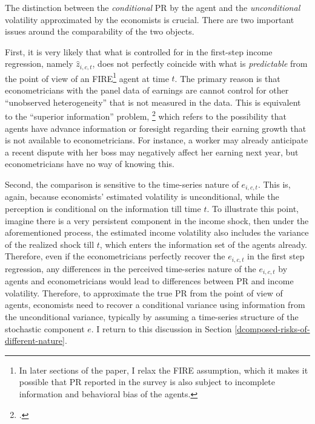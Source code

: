 The distinction between the \emph{conditional} PR by the agent and the \emph{unconditional} volatility approximated by the economists is crucial. There are two important issues around the comparability of the two objects. 

First, it is very likely that what is controlled for in the first-step income regression, namely $\hat z_{i,c,t}$, does not perfectly coincide with what is \emph{predictable} from the point of view of an FIRE\footnote{In later sections of the paper, I relax the FIRE assumption, which it makes it possible that PR reported in the survey is also subject to incomplete information and behavioral bias of the agents.} agent at time $t$. The primary reason is that econometricians with the panel data of earnings are cannot control for other ``unobserved heterogeneity'' that is not measured in the data. This is equivalent to the ``superior information'' problem,  \footnote{\cite{pistaferri_superior_2001, kaufmann_disentangling_2009}.} which refers to the possibility that agents have advance information or foresight regarding their earning growth that is not available to econometricians. For instance, a worker may already anticipate a recent dispute with her boss may negatively affect her earning next year, but econometricians have no way of knowing this. 

Second, the comparison is sensitive to the time-series nature of $e_{i,c,t}$. This is, again, because economists' estimated volatility is unconditional, while the perception is conditional on the information till time $t$. To illustrate this point, imagine there is a very persistent component in the income shock, then under the aforementioned process, the estimated income volatility also includes the variance of the realized shock till $t$, which enters the information set of the agents already. Therefore, even if the econometricians perfectly recover the $e_{i,c,t}$ in the first step regression, any differences in the perceived time-series nature of the $e_{i,c,t}$ by agents and econometricians would lead to differences between PR and income volatility. Therefore, to approximate the true PR from the point of view of agents, economists need to recover a conditional variance using information from the unconditional variance, typically by assuming a time-series structure of the stochastic component $e$. I return to this discussion in Section \ref{dcomposed-risks-of-different-nature}. 

